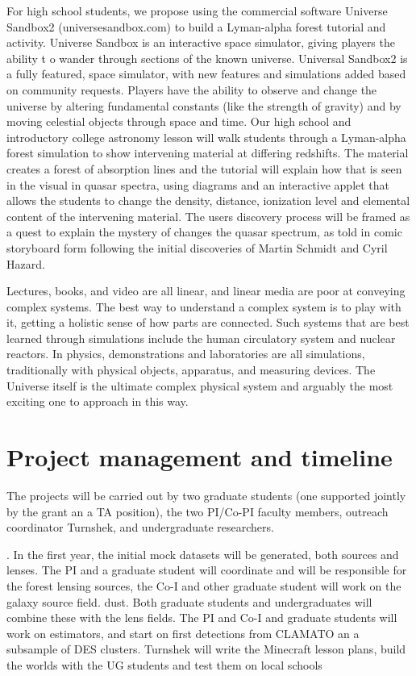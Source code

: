 \documentclass[12pt]{article}
\begin{document}
\begin{small}
For high school students, 
we propose using the commercial software Universe Sandbox2 
 (universesandbox.com) to build a Lyman-alpha forest tutorial 
and activity. 
Universe Sandbox is an interactive space simulator, giving players the ability t
o 
wander through sections of the known universe. Universal Sandbox2 is a fully 
featured, space simulator, with new features and simulations added 
based on community requests. Players have the ability to observe and 
change the universe by altering fundamental constants (like the strength of 
gravity) and by moving celestial objects through space and time. 
Our high school and introductory college astronomy lesson will walk 
students through a Lyman-alpha forest simulation to show intervening 
material at differing redshifts. The material creates a forest of absorption 
lines and the tutorial will explain how that is seen in the visual in quasar 
spectra, using diagrams and an interactive applet that allows the students to 
change the density, distance, ionization level and elemental content of the 
intervening material. The users discovery process will be framed as a quest to 
explain the mystery of changes the quasar spectrum, as told in 
comic storyboard 
form following the initial discoveries of Martin Schmidt and Cyril Hazard. 

 

Lectures, books, and video are all linear, and linear media are poor at 
conveying complex systems.  The best way to understand a complex 
system is to play with it, getting a holistic sense of how parts are 
connected.  Such systems that are best learned through simulations 
include the human circulatory system and nuclear reactors. 
In physics, demonstrations and laboratories are all simulations, 
traditionally with physical objects, apparatus, and measuring devices.
The Universe itself is the ultimate complex physical system and arguably
the most exciting one to approach in this way.



\section{Project management and timeline}
The projects will be carried out by two graduate students (one
supported jointly by the grant an a TA position), 
the two PI/Co-PI faculty
members, outreach coordinator Turnshek, and undergraduate researchers.

.  In the first year, the initial mock
datasets will be generated, both sources and lenses.
The PI and a graduate student
will coordinate and will be responsible for the 
forest lensing sources, the Co-I  and other graduate student will
work on the  galaxy source field.
dust. Both graduate students and undergraduates will combine these
with the lens fields. The PI and Co-I  and graduate students will
work on estimators, and start on first detections from CLAMATO an
a subsample of DES clusters. Turnshek will write the Minecraft lesson
plans, build the worlds with the 
UG students and test them on local schools 


\end{small}
\end{document}
